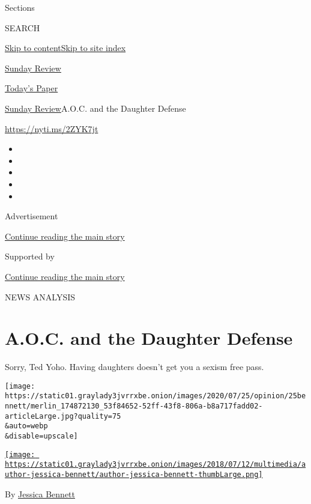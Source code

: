 Sections

SEARCH

\protect\hyperlink{site-content}{Skip to
content}\protect\hyperlink{site-index}{Skip to site index}

\href{https://www.nytimes3xbfgragh.onion/pages/opinion/index.html\#sundayreview}{Sunday
Review}

\href{https://myaccount.nytimes3xbfgragh.onion/auth/login?response_type=cookie\&client_id=vi}{}

\href{https://www.nytimes3xbfgragh.onion/section/todayspaper}{Today's
Paper}

\href{/pages/opinion/index.html}{Sunday Review}\textbar{}A.O.C. and the
Daughter Defense

\url{https://nyti.ms/2ZYK7jt}

\begin{itemize}
\item
\item
\item
\item
\item
\end{itemize}

Advertisement

\protect\hyperlink{after-top}{Continue reading the main story}

Supported by

\protect\hyperlink{after-sponsor}{Continue reading the main story}

NEWS ANALYSIS

\hypertarget{aoc-and-the-daughter-defense}{%
\section{A.O.C. and the Daughter
Defense}\label{aoc-and-the-daughter-defense}}

Sorry, Ted Yoho. Having daughters doesn't get you a sexism free pass.

\texttt{[image: https://static01.graylady3jvrrxbe.onion/images/2020/07/25/opinion/25bennett/merlin\_174872130\_53f84652-52ff-43f8-806a-b8a717fadd02-articleLarge.jpg?quality=75\\\&auto=webp\\\&disable=upscale]}

\href{https://www.nytimes3xbfgragh.onion/by/jessica-bennett}{\texttt{[image: https://static01.graylady3jvrrxbe.onion/images/2018/07/12/multimedia/author-jessica-bennett/author-jessica-bennett-thumbLarge.png]}}

By \href{https://www.nytimes3xbfgragh.onion/by/jessica-bennett}{Jessica
Bennett}

